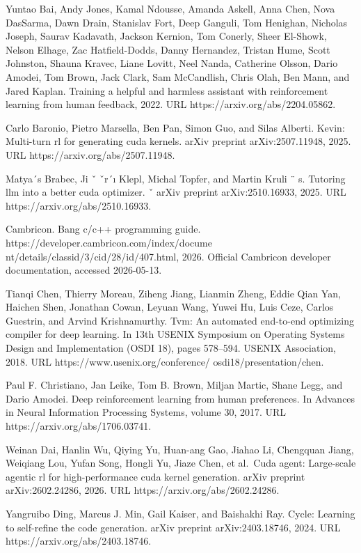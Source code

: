 \documentclass[
  10
]{article}
\begin{document}
Yuntao Bai, Andy Jones, Kamal Ndousse, Amanda Askell, Anna Chen, Nova
DasSarma, Dawn Drain, Stanislav Fort, Deep Ganguli, Tom Henighan,
Nicholas Joseph, Saurav Kadavath, Jackson Kernion, Tom Conerly, Sheer
El-Showk, Nelson Elhage, Zac Hatfield-Dodds, Danny Hernandez, Tristan
Hume, Scott Johnston, Shauna Kravec, Liane Lovitt, Neel Nanda, Catherine
Olsson, Dario Amodei, Tom Brown, Jack Clark, Sam McCandlish, Chris Olah,
Ben Mann, and Jared Kaplan. Training a helpful and harmless assistant
with reinforcement learning from human feedback, 2022. URL
https://arxiv.org/abs/2204.05862.

Carlo Baronio, Pietro Marsella, Ben Pan, Simon Guo, and Silas Alberti.
Kevin: Multi-turn rl for generating cuda kernels. arXiv preprint
arXiv:2507.11948, 2025. URL https://arxiv.org/abs/2507.11948.

Matya´s Brabec, Ji ˇ ˇr´ı Klepl, Michal Topfer, and Martin Kruli ¨ s.
Tutoring llm into a better cuda optimizer. ˇ arXiv preprint
arXiv:2510.16933, 2025. URL https://arxiv.org/abs/2510.16933.

Cambricon. Bang c/c++ programming guide.
https://developer.cambricon.com/index/docume
nt/details/classid/3/cid/28/id/407.html, 2026. Official Cambricon
developer documentation, accessed 2026-05-13.

Tianqi Chen, Thierry Moreau, Ziheng Jiang, Lianmin Zheng, Eddie Qian
Yan, Haichen Shen, Jonathan Cowan, Leyuan Wang, Yuwei Hu, Luis Ceze,
Carlos Guestrin, and Arvind Krishnamurthy. Tvm: An automated end-to-end
optimizing compiler for deep learning. In 13th USENIX Symposium on
Operating Systems Design and Implementation (OSDI 18), pages 578--594.
USENIX Association, 2018. URL https://www.usenix.org/conference/
osdi18/presentation/chen.

Paul F. Christiano, Jan Leike, Tom B. Brown, Miljan Martic, Shane Legg,
and Dario Amodei. Deep reinforcement learning from human preferences. In
Advances in Neural Information Processing Systems, volume 30, 2017. URL
https://arxiv.org/abs/1706.03741.

Weinan Dai, Hanlin Wu, Qiying Yu, Huan-ang Gao, Jiahao Li, Chengquan
Jiang, Weiqiang Lou, Yufan Song, Hongli Yu, Jiaze Chen, et al.~Cuda
agent: Large-scale agentic rl for high-performance cuda kernel
generation. arXiv preprint arXiv:2602.24286, 2026. URL
https://arxiv.org/abs/2602.24286.

Yangruibo Ding, Marcus J. Min, Gail Kaiser, and Baishakhi Ray. Cycle:
Learning to self-refine the code generation. arXiv preprint
arXiv:2403.18746, 2024. URL https://arxiv.org/abs/2403.18746.
\end{document}
